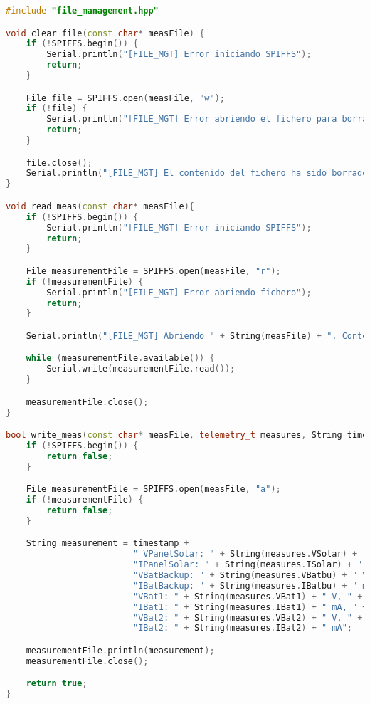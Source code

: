 \begin{lstlisting}[language=c++,caption={Fichero \texttt{file\_management.cpp}},captionpos=b]
#include "file_management.hpp"

void clear_file(const char* measFile) {
    if (!SPIFFS.begin()) {
        Serial.println("[FILE_MGT] Error iniciando SPIFFS");
        return;
    }

    File file = SPIFFS.open(measFile, "w");
    if (!file) {
        Serial.println("[FILE_MGT] Error abriendo el fichero para borrar");
        return;
    }

    file.close();
    Serial.println("[FILE_MGT] El contenido del fichero ha sido borrado.");
}

void read_meas(const char* measFile){
    if (!SPIFFS.begin()) {
        Serial.println("[FILE_MGT] Error iniciando SPIFFS");
        return;
    }

    File measurementFile = SPIFFS.open(measFile, "r");
    if (!measurementFile) {
        Serial.println("[FILE_MGT] Error abriendo fichero");
        return;
    }

    Serial.println("[FILE_MGT] Abriendo " + String(measFile) + ". Contenido: ");

    while (measurementFile.available()) {
        Serial.write(measurementFile.read());
    }

    measurementFile.close();
}

bool write_meas(const char* measFile, telemetry_t measures, String timestamp) {
    if (!SPIFFS.begin()) {
        return false;
    }

    File measurementFile = SPIFFS.open(measFile, "a");
    if (!measurementFile) {
        return false;
    }

    String measurement = timestamp +
                         " VPanelSolar: " + String(measures.VSolar) + " V, " +
                         "IPanelSolar: " + String(measures.ISolar) + " mA, " +
                         "VBatBackup: " + String(measures.VBatbu) + " V, " +
                         "IBatBackup: " + String(measures.IBatbu) + " mA, " +
                         "VBat1: " + String(measures.VBat1) + " V, " +
                         "IBat1: " + String(measures.IBat1) + " mA, " +
                         "VBat2: " + String(measures.VBat2) + " V, " +
                         "IBat2: " + String(measures.IBat2) + " mA";

    measurementFile.println(measurement);
    measurementFile.close();

    return true;
}
\end{lstlisting}


